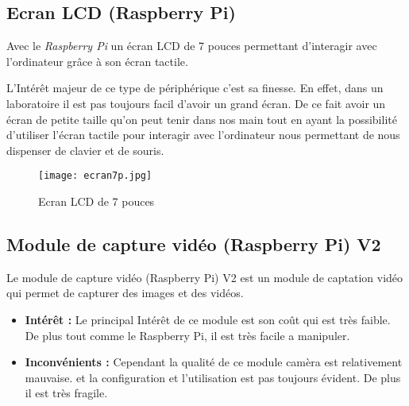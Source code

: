  
        \subsection{Ecran LCD (Raspberry Pi)}
        Avec le \textit{Raspberry Pi} un écran LCD de 7 pouces permettant d'interagir avec l'ordinateur grâce à son écran tactile. 

        \begin{flushleft}
            L'Intérêt majeur de ce type de périphérique c'est sa finesse.
            En effet, dans un laboratoire il est pas toujours facil d'avoir un grand écran.
            De ce fait avoir un écran de petite taille qu'on peut tenir dans nos main tout en ayant la possibilité d'utiliser l'écran tactile pour interagir avec l'ordinateur nous permettant de nous dispenser de clavier et de souris.
        \end{flushleft}

        \begin{figure}[ht]
            \centering
            \texttt{[image: ecran7p.jpg]} 
            \caption{Ecran LCD de 7 pouces}
        \end{figure}

        \vspace{1cm}

        \subsection{Module de capture vidéo (Raspberry Pi) V2}
        Le module de capture vidéo (Raspberry Pi) V2 est un module de captation vidéo qui permet de capturer des images et des vidéos.


        \begin{flushleft}
            \begin{itemize}
                \item \textbf{Intérêt :}
                Le principal Intérêt de ce module est son coût qui est très faible. De plus tout comme le Raspberry Pi, il est très facile a manipuler. 
                \item \textbf{Inconvénients :}
                Cependant la qualité de ce module camèra est relativement mauvaise. et la configuration et l'utilisation est pas toujours évident.
                De plus il est très fragile.
            \end{itemize}                
        \end{flushleft}


